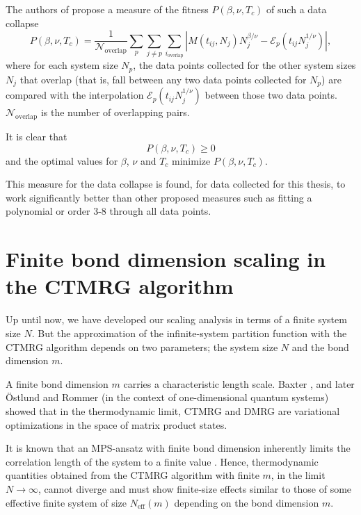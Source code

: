The authors of \cite{bhattacharjee2001measure} propose a measure of the fitness $P(\beta, \nu, T_c)$ of such a data collapse
\begin{equation}
  P(\beta, \nu, T_c) = \frac{1}{\mathcal{N}_{\text{overlap}}} \sum_p \sum_{j \neq p} \sum_{i_{\text{overlap}}}
    |  M(t_{i j}, N_j) N_{j}^{\beta/\nu} - \mathcal{E}_{p}(t_{i j} N_{j}^{1/\nu} ) |,
\end{equation}
where for each system size $N_p$, the data points collected for the other system sizes $N_j$ that overlap (that is,
fall between any two data points collected for $N_p$) are compared with the interpolation $\mathcal{E}_{p}(t_{i j}
N_{j}^{1/\nu})$ between those two data points. $\mathcal{N}_{\text{overlap}}$ is the number of overlapping pairs.

It is clear that
\begin{equation}
  P(\beta, \nu, T_c) \geq 0
\end{equation}
and the optimal values for $\beta$, $\nu$ and $T_c$ minimize $P(\beta, \nu, T_c)$.

This measure for the data collapse is found, for data collected for this thesis,
to work significantly better than other proposed measures such as fitting a polynomial or order 3-8 through all data
points.

\section{Finite bond dimension scaling in the CTMRG algorithm}

Up until now, we have developed our scaling analysis in terms of a finite system size $N$.
But the approximation of the infinite-system partition function with the CTMRG algorithm depends on two parameters;
the system size $N$ and the bond dimension $m$.

A finite bond dimension $m$ carries a characteristic length scale.
Baxter \cite{baxter1978variational}, and later Östlund and Rommer \cite{ostlund1995thermodynamic} (in the context of
one-dimensional quantum systems) showed that in the thermodynamic limit,
CTMRG and DMRG are variational optimizations in the space of matrix product states.

It is known that an MPS-ansatz with finite bond dimension inherently limits the
correlation length of the system to a finite value \cite{wolf2006quantum, rommer1997class}. Hence,
thermodynamic quantities obtained from the CTMRG algorithm with finite $m$, in the limit
$N \to \infty$, cannot diverge and must show finite-size effects similar to those of some
effective finite system of size $N_{\text{eff}}(m)$ depending on the bond dimension $m$.

